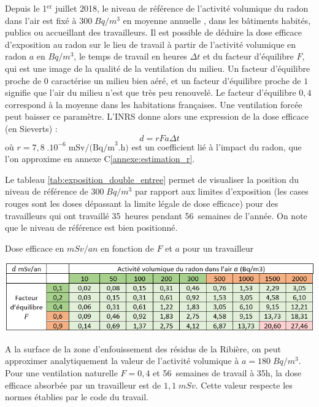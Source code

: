 \documentclass{article}
\begin{document}
Depuis le 1$^{\text{er}}$ juillet 2018, le niveau de référence de l’activité volumique du radon dans l'air est fixé à $300 \; Bq/m^3$ en moyenne annuelle \cite{autorite_de_surete_nucleaire_reglementation_nodate}, dans les bâtiments habités, publics ou accueillant des travailleurs. Il est possible de déduire la dose efficace d’exposition au radon sur le lieu de travail à partir de l’activité volumique en radon $a$ en $Bq/m^3$, le temps de travail en heures $\Delta t$ et du facteur d’équilibre $F$, qui est une image de la qualité de la ventilation du milieu. Un facteur d’équilibre proche de $0$ caractérise un milieu bien aéré, et un facteur d’équilibre proche de $1$ signifie que l’air du milieu n’est que très peu renouvelé. Le facteur d’équilibre $0,4$ correspond à la moyenne dans les habitations françaises. Une ventilation forcée peut baisser ce paramètre. L'INRS donne alors une expression \cite{blanchardon_evaluation_2019} de la dose efficace (en Sieverts) : $$
d = r F a \Delta t
$$
où $r=7,8 \; .10^{-6} \; \text{mSv/(Bq/m}^3\text{.h})$ est un coefficient lié à l’impact du radon, que l'on approxime en annexe C\ref{annexe:estimation_r}. %

Le tableau \ref{tab:exposition_double_entree} permet de visualiser la position du niveau de référence de $300 \; Bq/m^3$ par rapport aux limites d’exposition (les cases rouges sont les doses dépassant la limite légale de dose efficace) pour des travailleurs qui ont travaillé 35~heures pendant 56~semaines de l’année. On note que le niveau de référence est bien positionné.

\begin{table}[H]
    \centering
    \caption{Dose efficace en $mSv/an$ en fonction de $F$ et $a$ pour un travailleur}
    \includegraphics[width=\linewidth]{II_A2_6.png}

    \label{tab:exposition_double_entree}
\end{table}

A la surface de la zone d’enfouissement des résidus de la Ribière, on peut approximer analytiquement la valeur de l’activité volumique à $a=180 \; Bq/m^3$. Pour une ventilation naturelle $F=0,4$ et 56~semaines de travail à 35h, la dose efficace absorbée par un travailleur est de $1,1 \; mSv$. Cette valeur respecte les normes établies par le code du travail.
\end{document}
